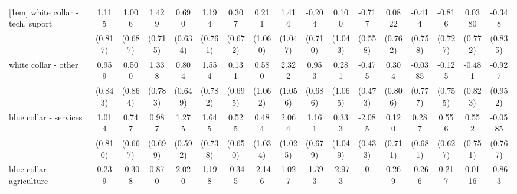 {\begin{tabular}{l*{16}{c}}
[1em]
white collar - tech. suport&       1.115         &       1.006         &       1.429\sym{*}  &       0.690         &       1.194         &       0.307         &       0.211         &       1.414         &      -0.204         &       0.100         &      -0.717         &      0.0822         &      -0.414         &      -0.816         &      0.0380         &      -0.348         \\
                    &     (0.817)         &     (0.687)         &     (0.715)         &     (0.634)         &     (0.761)         &     (0.672)         &     (1.060)         &     (1.047)         &     (0.710)         &     (1.043)         &     (0.558)         &     (0.762)         &     (0.758)         &     (0.727)         &     (0.772)         &     (0.835)         \\
[1em]
white collar - other&       0.959         &       0.500         &       1.338         &       0.804         &       1.554\sym{*}  &       0.131         &       0.580         &       2.322\sym{*}  &       0.953         &       0.281         &      -0.475         &       0.304         &     -0.0385         &      -0.125         &      -0.481         &      -0.927         \\
                    &     (0.843)         &     (0.864)         &     (0.783)         &     (0.649)         &     (0.782)         &     (0.695)         &     (1.062)         &     (1.056)         &     (0.686)         &     (1.065)         &     (0.473)         &     (0.806)         &     (0.777)         &     (0.755)         &     (0.823)         &     (0.952)         \\
[1em]
blue collar - services&       1.014         &       0.747         &       0.987         &       1.275\sym{*}  &       1.645\sym{*}  &       0.525         &       0.484         &       2.064\sym{*}  &       1.161         &       0.333         &      -2.085\sym{***}&       0.120         &       0.287         &       0.556         &       0.552         &     -0.0585         \\
                    &     (0.810)         &     (0.667)         &     (0.699)         &     (0.592)         &     (0.738)         &     (0.650)         &     (1.034)         &     (1.025)         &     (0.679)         &     (1.049)         &     (0.433)         &     (0.711)         &     (0.681)         &     (0.627)         &     (0.751)         &     (0.767)         \\
[1em]
blue collar - agriculture&       0.239         &      -0.308         &       0.870         &       2.020\sym{**} &       1.198         &      -0.345         &      -2.146         &       1.027         &      -1.393         &      -2.973\sym{*}  &           0         &       0.269         &      -0.266         &       0.217         &      0.0116         &      -0.863         \\

\end{tabular}}
